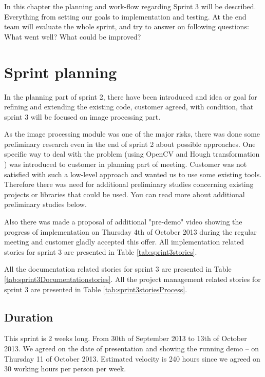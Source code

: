In this chapter the planning and work-flow regarding Sprint 3 will be described. 
Everything from setting our goals to implementation and testing. At the end team will evaluate the whole sprint, and try to answer on following questions: What went well? What could be improved?  

\section{Sprint planning}
In the planning part of sprint 2, there have been introduced and idea or goal for refining and extending the existing code, customer agreed, with condition, that sprint 3 will be focused on image processing part.

As the image processing module was one of the major risks, there was done some preliminary research even in the end of sprint 2 about possible approaches.
One specific way to deal with the problem (using OpenCV and Hough transformation \cite{Duda:1972:UHT:361237.361242}) was introduced to customer in planning part of meeting.
Customer was not satisfied with such a low-level approach and wanted us to use some existing tools.
Therefore there was need for additional preliminary studies concerning existing projects or libraries that could be used.
You can read more about additional preliminary studies below.

Also there was made a proposal of additional "pre-demo" video showing the progress of implementation on Thursday 4th of October 2013 during the regular meeting and customer gladly accepted this offer.
\newpage
All implementation related stories for sprint 3 are presented in Table \ref{tab:sprint3stories}.

All the documentation related stories for sprint 3 are presented in Table \ref{tab:sprint3Documentationstories}.
\newpage
All the project management related stories for sprint 3 are presented in Table \ref{tab:sprint3storiesProcess}.

\subsection{Duration}
This sprint is 2 weeks long. From 30th of September 2013 to 13th of October 2013.
We agreed on the date of presentation and showing the running demo -- on Thursday 11 of October 2013.
Estimated velocity is 240 hours since we agreed on 30 working hours per person per week.


